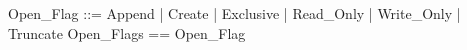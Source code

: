 \pagestyle{empty}

\begin{zed}
Open\_Flag ::= Append | Create | Exclusive | Read\_Only | Write\_Only | Truncate
\also
Open\_Flags == \power Open\_Flag
\end{zed}

